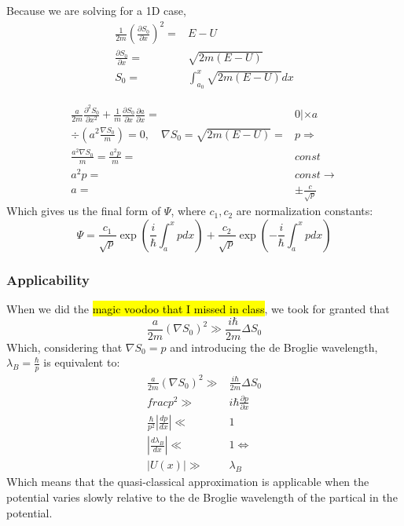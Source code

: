 		Because we are solving for a 1D case,
		\begin{align}
			\frac{1}{2m}\left(\frac{\partial S_0}{\partial x}\right)^2 =& E - U\\
			\frac{\partial S_0}{\partial x} =& \sqrt{2m(E-U)}\\
			S_0 =& \int_{a_0}^{x}\sqrt{2m(E-U)}dx
		\end{align}	
	
		\begin{align}
			\frac{a}{2m} \frac{\partial^2 S_0}{\partial x^2} + \frac{1}{m}\frac{\partial S_0}{\partial x}\frac{\partial a}{\partial x} =& 0 |\times a\\
			\div\left(a^2 \frac{\nabla S_0}{m}\right) = 0, \quad \nabla S_0 = \sqrt{2m(E-U)} =& p \Rightarrow\\
			\frac{a^2\nabla S_0}{m} = \frac{a^2p}{m} =& const \\
			a^2p =& const \rightarrow \\
			a =& \pm \frac{c}{\sqrt{p}}
		\end{align}
		Which gives us the final form of $\Psi$, where $c_1, c_2$ are normalization constants:
		\begin{equation}
			\Psi = \frac{c_1}{\sqrt{p}}\exp(\frac{i}{\hbar}\int_a^x pdx) + \frac{c_2}{\sqrt{p}}\exp(-\frac{i}{\hbar}\int_a^x pdx)
		\end{equation}
		\subsubsection{Applicability}
			When we did the \hl{magic voodoo that I missed in class}, we took for granted that 
			\begin{equation}
				\frac{a}{2m}(\nabla S_0)^2 \gg \frac{i\hbar}{2m}\Delta S_0
			\end{equation}
			Which, considering that $\nabla S_0 = p$ and introducing the de Broglie wavelength, $\lambda_B = \frac{\hbar}{p}$ is equivalent to:
			\begin{align}
				\frac{a}{2m}(\nabla S_0)^2 \gg& \frac{i\hbar}{2m}\Delta S_0 \\
				frac{p^2} \gg& i\hbar\frac{\partial p}{\partial x} \\ 
				\frac{\hbar}{p^2}\left|\frac{dp}{dx}\right| \ll& 1 \\
				\left|\frac{d\lambda_B}{dx}\right| \ll&  1 \Leftrightarrow\\
				\left|U(x)\right| \gg& \lambda_B
			\end{align}
			Which means that the quasi-classical approximation is applicable when the potential varies slowly relative to the de Broglie wavelength of the partical in the potential.
	
